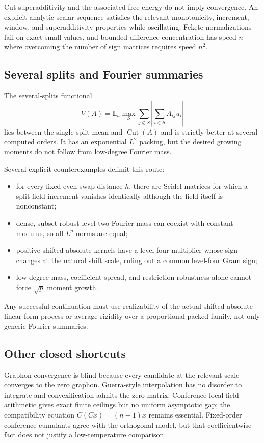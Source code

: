 \documentclass[11pt]{article}
\theoremstyle{definition}
\theoremstyle{remark}
\newcommand{\E}{\mathbb E}
\newcommand{\Cut}{\operatorname{Cut}}
\begin{document}
Cut superadditivity and the associated free energy do not imply convergence.
An explicit analytic scalar sequence satisfies the relevant monotonicity,
increment, window, and superadditivity properties while oscillating.  Fekete
normalizations fail on exact small values, and bounded-difference
concentration has speed $n$ where overcoming the number of sign matrices
requires speed $n^2$.

\subsection{Several splits and Fourier summaries}

The several-splits functional
\[
 V(A)=\E_u\max_S
 \sum_{j\notin S}\left|\sum_{i\in S}A_{ij}u_i\right|
\]
lies between the single-split mean and $\Cut(A)$ and is strictly better at
several computed orders.  It has an exponential $L^2$ packing, but the
desired growing moments do not follow from low-degree Fourier mass.

Several explicit counterexamples delimit this route:
\begin{itemize}
\item for every fixed even swap distance $h$, there are Seidel matrices for
      which a split-field increment vanishes identically although the field
      itself is nonconstant;
\item dense, subset-robust level-two Fourier mass can coexist with constant
      modulus, so all $L^p$ norms are equal;
\item positive shifted absolute kernels have a level-four multiplier whose
      sign changes at the natural shift scale, ruling out a common
      level-four Gram sign;
\item low-degree mass, coefficient spread, and restriction robustness alone
      cannot force $\sqrt p$ moment growth.
\end{itemize}
Any successful continuation must use realizability of the actual shifted
absolute-linear-form process or average rigidity over a proportional packed
family, not only generic Fourier summaries.

\subsection{Other closed shortcuts}

Graphon convergence is blind because every candidate at the relevant scale
converges to the zero graphon.  Guerra-style interpolation has no disorder to
integrate and convexification admits the zero matrix.  Conference local-field
arithmetic gives exact finite ceilings but no uniform asymptotic gap; the
compatibility equation $C(Cx)=(n-1)x$ remains essential.  Fixed-order
conference cumulants agree with the orthogonal model, but that coefficientwise
fact does not justify a low-temperature comparison.
\end{document}
